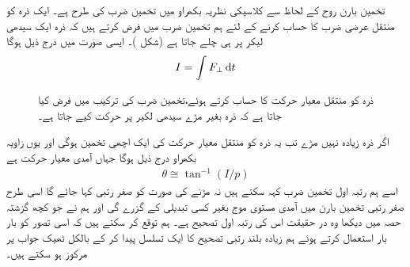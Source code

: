 تخمین بارن روح کے لحاظ سے کلاسیکی نظریہ بکھراو میں تخمین ضرب کی طرح ہے۔ ایک ذرہ کو منتقل عرضی ضرب کا حساب کرنے کے لئے ہم تخمین ضرب میں فرض کرتے ہیں
 کہ ذرہ ایک سیدھی لیکر پر ہی چلے جاتا ہے  (شکل )۔  ایسی صورت میں درج ذیل ہوگا
\begin{align}
	I=\int F_\perp\dif t
\end{align}
%
\begin{figure}
\centering
{}
\caption{ ذرہ  کو منتقل معیار حرکت کا حساب کرتے ہوئے،تخمین ضرب کی ترکیب  میں فرض کیا  جاتا ہے کہ ذرہ بغیر  مڑے سیدھی لکیر پر حرکت کیے جاتا ہے۔}
\label{شکل_بکھراو_تخمین_ضرب}
\end{figure}

اگر ذرہ زیادہ نہیں مڑے تب یہ ذرہ کو منتقل معیار حرکت کی ایک اچھی تخمین ہوگی اور یوں زاویہ بکھراو درج ذیل ہوگا جہاں  آمدی معیار حرکت ہے 
\begin{align}
	\theta\cong\tan^{-1}(I/p)
\end{align}
اسے ہم رتبہ اول تخمین ضرب کہہ سکتے ہیں نہ مڑنے کی صورت کو صفر رتبی کہا جائے گا اسی طرح صفر رتبی تخمین بارن میں آمدی مستوی موج بغیر کسی تبدیلی کے گزرے گی اور ہم نے جو کچھ گزشتہ حصہ میں دیکھا وہ در حقیقت اس کی رتبہ اول تصحیح ہے۔ ہم توقع کر سکتے ہیں کہ اسی تصور کو بار بار استعمال کرتے ہوئے ہم زیادہ بلند رتبی تصحیح کا ایک تسلسل پیدا کر کے بالکل  ٹھیک جواب پر مرکوز ہو سکتے ہیں۔

